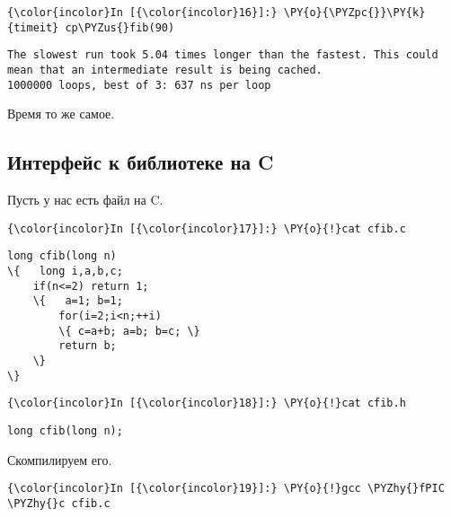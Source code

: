     \begin{Verbatim}[commandchars=\\\{\}]
{\color{incolor}In [{\color{incolor}16}]:} \PY{o}{\PYZpc{}}\PY{k}{timeit} cp\PYZus{}fib(90)
\end{Verbatim}

    \begin{Verbatim}[commandchars=\\\{\}]
The slowest run took 5.04 times longer than the fastest. This could mean that an intermediate result is being cached.
1000000 loops, best of 3: 637 ns per loop

    \end{Verbatim}

    Время то же самое.

\subsection{Интерфейс к библиотеке на C}
\label{cython3}

Пусть у нас есть файл на C.

    \begin{Verbatim}[commandchars=\\\{\}]
{\color{incolor}In [{\color{incolor}17}]:} \PY{o}{!}cat cfib.c
\end{Verbatim}

    \begin{Verbatim}[commandchars=\\\{\}]
long cfib(long n)
\{   long i,a,b,c;
    if(n<=2) return 1;
    \{   a=1; b=1;
        for(i=2;i<n;++i)
        \{ c=a+b; a=b; b=c; \}
        return b;
    \}
\}

    \end{Verbatim}

    \begin{Verbatim}[commandchars=\\\{\}]
{\color{incolor}In [{\color{incolor}18}]:} \PY{o}{!}cat cfib.h
\end{Verbatim}

    \begin{Verbatim}[commandchars=\\\{\}]
long cfib(long n);

    \end{Verbatim}

    Скомпилируем его.

    \begin{Verbatim}[commandchars=\\\{\}]
{\color{incolor}In [{\color{incolor}19}]:} \PY{o}{!}gcc \PYZhy{}fPIC \PYZhy{}c cfib.c
\end{Verbatim}

